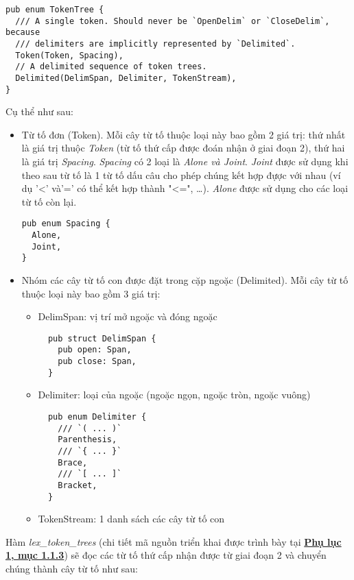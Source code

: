 \begin{lstlisting}
pub enum TokenTree {
  /// A single token. Should never be `OpenDelim` or `CloseDelim`, because
  /// delimiters are implicitly represented by `Delimited`.
  Token(Token, Spacing),
  // A delimited sequence of token trees.
  Delimited(DelimSpan, Delimiter, TokenStream),
}
\end{lstlisting}

Cụ thể như sau:
\begin{itemize}
  \item Từ tố đơn (Token). Mỗi cây từ tố thuộc loại này bao gồm 2 giá trị: thứ nhất là giá trị thuộc \textit{Token} (từ tố thứ cấp được đoán nhận ở giai đoạn 2), thứ hai là giá trị \textit{Spacing}. \textit{Spacing} có 2 loại là \textit{Alone \emph{và} Joint}. \textit{Joint} được sử dụng khi theo sau từ tố là 1 từ tố dấu câu cho phép chúng kết hợp đựợc với nhau (ví dụ '<' và'=' có thể kết hợp thành "<=", \dots). \textit{Alone} được sử dụng cho các loại từ tố còn lại. 
\begin{lstlisting}
pub enum Spacing {
  Alone,
  Joint,
}
\end{lstlisting}
  \item Nhóm các cây từ tố con được đặt trong cặp ngoặc (Delimited). Mỗi cây từ tố thuộc loại này bao gồm 3 giá trị:
  \begin{itemize}
    \item DelimSpan: vị trí mở ngoặc và đóng ngoặc
\begin{lstlisting}
  pub struct DelimSpan {
    pub open: Span,
    pub close: Span,
  }
\end{lstlisting}
    \item Delimiter: loại của ngoặc (ngoặc ngọn, ngoặc tròn, ngoặc vuông)
\begin{lstlisting}
  pub enum Delimiter {
    /// `( ... )`
    Parenthesis,
    /// `{ ... }`
    Brace,
    /// `[ ... ]`
    Bracket,
  }
\end{lstlisting}
    \item TokenStream: 1 danh sách các cây từ tố con
  \end{itemize}
\end{itemize}

Hàm \textit{lex\_token\_trees} (chi tiết mã nguồn triển khai được trình bày tại \hyperref[ap1:token_tree_lex_token_trees]{\bf Phụ lục 1, mục 1.1.3}) sẽ đọc các từ tố thứ cấp nhận được từ giai đoạn 2 và chuyển chúng thành cây từ tố như sau:


